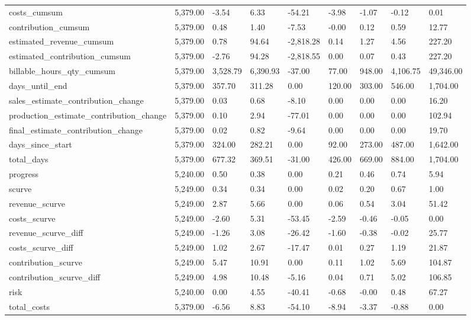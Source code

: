 \begin{tabular}{lllllllll}
costs_cumsum & 5,379.00 & -3.54 & 6.33 & -54.21 & -3.98 & -1.07 & -0.12 & 0.01 \\
contribution_cumsum & 5,379.00 & 0.48 & 1.40 & -7.53 & -0.00 & 0.12 & 0.59 & 12.77 \\
estimated_revenue_cumsum & 5,379.00 & 0.78 & 94.64 & -2,818.28 & 0.14 & 1.27 & 4.56 & 227.20 \\
estimated_contribution_cumsum & 5,379.00 & -2.76 & 94.28 & -2,818.55 & 0.00 & 0.07 & 0.43 & 227.20 \\
billable_hours_qty_cumsum & 5,379.00 & 3,528.79 & 6,390.93 & -37.00 & 77.00 & 948.00 & 4,106.75 & 49,346.00 \\
days_until_end & 5,379.00 & 357.70 & 311.28 & 0.00 & 120.00 & 303.00 & 546.00 & 1,704.00 \\
sales_estimate_contribution_change & 5,379.00 & 0.03 & 0.68 & -8.10 & 0.00 & 0.00 & 0.00 & 16.20 \\
production_estimate_contribution_change & 5,379.00 & 0.10 & 2.94 & -77.01 & 0.00 & 0.00 & 0.00 & 102.94 \\
final_estimate_contribution_change & 5,379.00 & 0.02 & 0.82 & -9.64 & 0.00 & 0.00 & 0.00 & 19.70 \\
days_since_start & 5,379.00 & 324.00 & 282.21 & 0.00 & 92.00 & 273.00 & 487.00 & 1,642.00 \\
total_days & 5,379.00 & 677.32 & 369.51 & -31.00 & 426.00 & 669.00 & 884.00 & 1,704.00 \\
progress & 5,240.00 & 0.50 & 0.38 & 0.00 & 0.21 & 0.46 & 0.74 & 5.94 \\
scurve & 5,249.00 & 0.34 & 0.34 & 0.00 & 0.02 & 0.20 & 0.67 & 1.00 \\
revenue_scurve & 5,249.00 & 2.87 & 5.66 & 0.00 & 0.06 & 0.54 & 3.04 & 51.42 \\
costs_scurve & 5,249.00 & -2.60 & 5.31 & -53.45 & -2.59 & -0.46 & -0.05 & 0.00 \\
revenue_scurve_diff & 5,249.00 & -1.26 & 3.08 & -26.42 & -1.60 & -0.38 & -0.02 & 25.77 \\
costs_scurve_diff & 5,249.00 & 1.02 & 2.67 & -17.47 & 0.01 & 0.27 & 1.19 & 21.87 \\
contribution_scurve & 5,249.00 & 5.47 & 10.91 & 0.00 & 0.11 & 1.02 & 5.69 & 104.87 \\
contribution_scurve_diff & 5,249.00 & 4.98 & 10.48 & -5.16 & 0.04 & 0.71 & 5.02 & 106.85 \\
risk & 5,240.00 & 0.00 & 4.55 & -40.41 & -0.68 & -0.00 & 0.48 & 67.27 \\
total_costs & 5,379.00 & -6.56 & 8.83 & -54.10 & -8.94 & -3.37 & -0.88 & 0.00 \\

\end{tabular}
